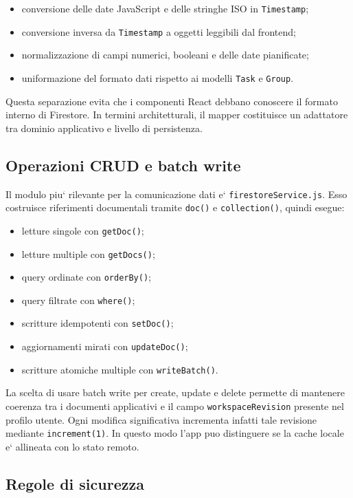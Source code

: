 \documentclass[11pt,a4paper]{article}
\begin{document}
\begin{itemize}
  \item conversione delle date JavaScript e delle stringhe ISO in \texttt{Timestamp};
  \item conversione inversa da \texttt{Timestamp} a oggetti leggibili dal frontend;
  \item normalizzazione di campi numerici, booleani e delle date pianificate;
  \item uniformazione del formato dati rispetto ai modelli \texttt{Task} e \texttt{Group}.
\end{itemize}

Questa separazione evita che i componenti React debbano conoscere il formato interno di Firestore. In termini architetturali, il mapper costituisce un adattatore tra dominio applicativo e livello di persistenza.

\subsection{Operazioni CRUD e batch write}

Il modulo piu` rilevante per la comunicazione dati e` \texttt{firestoreService.js}. Esso costruisce riferimenti documentali tramite \texttt{doc()} e \texttt{collection()}, quindi esegue:

\begin{itemize}
  \item letture singole con \texttt{getDoc()};
  \item letture multiple con \texttt{getDocs()};
  \item query ordinate con \texttt{orderBy()};
  \item query filtrate con \texttt{where()};
  \item scritture idempotenti con \texttt{setDoc()};
  \item aggiornamenti mirati con \texttt{updateDoc()};
  \item scritture atomiche multiple con \texttt{writeBatch()}.
\end{itemize}

La scelta di usare batch write per create, update e delete permette di mantenere coerenza tra i documenti applicativi e il campo \texttt{workspaceRevision} presente nel profilo utente. Ogni modifica significativa incrementa infatti tale revisione mediante \texttt{increment(1)}. In questo modo l'app puo distinguere se la cache locale e` allineata con lo stato remoto.

\subsection{Regole di sicurezza}
\end{document}
